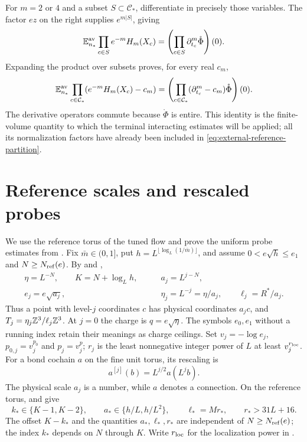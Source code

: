 For $m=2$ or $4$ and a subset $S\subset\mathcal C_*$,
differentiate in precisely those variables. The
factor $ez$ on the right supplies $e^{m|S|}$, giving
\[
 \mathbb E_{n_*}^{\mathrm{av}}\prod_{c\in S}e^{-m}H_m(X_c)
         =\left(\prod_{c\in S}\partial_{t_c}^m
                                      \mathring\Phi\right)(0).
\]
Expanding the product over subsets proves, for
every real $c_m$,
\begin{equation}\label{eq:external-Wick-product}
 \mathbb E_{n_*}^{\mathrm{av}}
        \prod_{c\in\mathcal C_*}(e^{-m}H_m(X_c)-c_m)
     =\left(\prod_{c\in\mathcal C_*}
                (\partial_{t_c}^m-c_m)\mathring\Phi\right)(0).
\end{equation}
The derivative operators commute because
$\mathring\Phi$ is entire. This identity is the
finite-volume quantity to which the terminal
interacting estimates will be applied; all its
normalization factors have already been included
in \eqref{eq:external-reference-partition}.


\section{Reference scales and rescaled probes}
\label{subsec:interacting-stop-probe}

We use the reference torus of the tuned flow and prove the
uniform probe estimates from \cite[\S21.1]{QED3Master}.
Fix $\bar m\in(0,1]$, put
$h=L^{\lfloor\log_L(1/\bar m)\rfloor}$, and assume
$0<e\sqrt h\le e_1$ and $N\ge N_{\rm ref}(e)$.
By \cite[(47)]{CoverTuning} and
\cite[(53)]{CoverTuning},
\begin{equation}\label{eq:interacting-physical-scales}
 \begin{aligned}
 \eta=L^{-N},\qquad K=N+\log_Lh,\qquad
 &a_j=L^{j-N},\\
 e_j=e\sqrt{a_j},\qquad
 &\eta_j=L^{-j}=\eta/a_j,\qquad \ell_j=R^*/a_j .
 \end{aligned}
\end{equation}
Thus a point with level-$j$ coordinates $c$
has physical coordinates $a_jc$, and
$T_j=\eta_j\mathbb Z^3/\ell_j\mathbb Z^3$.
At $j=0$ the charge is $q=e\sqrt\eta$.
The symbols $e_0,e_1$ without a running
index retain their meanings as charge ceilings.
Set $v_j=-\log e_j$, $p_{0,j}=v_j^{p_0}$ and $p_j=v_j^p$;
$r_j$ is the least nonnegative integer power of $L$ at least
$v_j^{r_{\rm loc}}$.
For a bond cochain $a$ on the fine unit torus,
its rescaling is
\begin{equation}\label{eq:interacting-connection-rescaling}
                    a^{[j]}(b)=L^{j/2}a(L^jb).
\end{equation}
The physical scale $a_j$ is a number, while
$a$ denotes a connection.
On the reference torus,
\cite[(54)]{CoverTuning} and
\cite[(50)]{CoverTuning} give
\[
 k_*\in\{K-1,K-2\},\qquad
 a_*\in\{h/L,h/L^2\},\qquad
 \ell_*=Mr_*,\qquad r_*>31L+16.
\]
The offset $K-k_*$ and the quantities $a_*,\ell_*,r_*$ are
independent of $N\ge N_{\rm ref}(e)$; the index $k_*$
depends on $N$ through $K$.
Write $r_{\rm loc}$ for the localization
power in \cite[\S6.1]{CoverTuning}.

